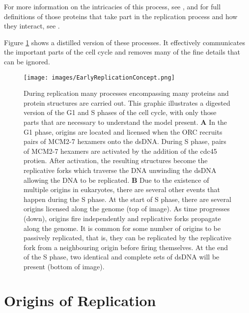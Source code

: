		For more information on the intricacies of this process, see \cite{OriginsReview}, and for full definitions of those proteins that take part in the replication process and how they interact, see \cite{PurifiedProteins}.
		
	Figure \ref{fig:EarlyReplicationConcept} shows a distilled version of these processes. It effectively communicates the important parts of the cell cycle and removes many of the fine details that can be ignored.
	
	\begin{figure}[tbh]
		\begin{center}
			\texttt{[image: images/EarlyReplicationConcept.png]}
		\end{center}
			\caption[Events During Replication]{\label{fig:EarlyReplicationConcept} During replication many processes encompassing many proteins and protein structures are carried out.
				This graphic illustrates a digested version of the G1 and S phases of the cell cycle, with only those parts that are necessary to understand the model present.
				\textbf{A} In the G1 phase, origins are located and licensed when the ORC recruits pairs of MCM2-7 hexamers onto the dsDNA.
					During S phase, pairs of MCM2-7 hexamers are activated by the addition of the cdc45 protien.
					After activation, the resulting structures become the replicative forks which traverse the DNA unwinding the dsDNA allowing the DNA to be replicated.
				\textbf{B} Due to the existence of multiple origins in eukaryotes, there are several other events that happen during the S phase.
					At the start of S phase, there are several origins licensed along the genome (top of image).
					As time progresses (down), origins fire independently and replicative forks propagate along the genome.
					It is common for some number of origins to be passively replicated, that is, they can be replicated by the replicative fork from a neighbouring origin before firing themselves.
					At the end of the S phase, two identical and complete sets of dsDNA will be present (bottom of image).}
	\end{figure}
	
	
	\section{Origins of Replication}
	\label{sec:Origins}
	

